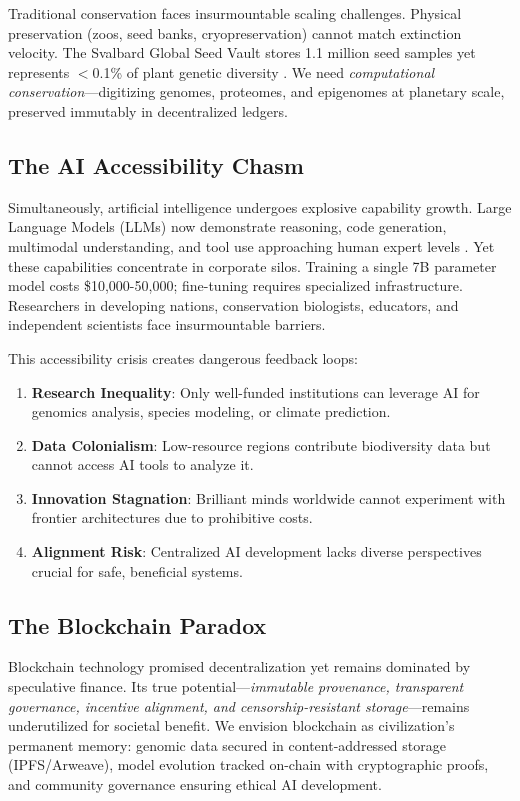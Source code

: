 \documentclass[twocolumn,11pt]{article}
\begin{document}
Traditional conservation faces insurmountable scaling challenges. Physical preservation (zoos, seed banks, cryopreservation) cannot match extinction velocity. The Svalbard Global Seed Vault stores 1.1 million seed samples yet represents $<$0.1\% of plant genetic diversity \citep{svalbard2023report}. We need \textit{computational conservation}—digitizing genomes, proteomes, and epigenomes at planetary scale, preserved immutably in decentralized ledgers.

\subsection{The AI Accessibility Chasm}

Simultaneously, artificial intelligence undergoes explosive capability growth. Large Language Models (LLMs) now demonstrate reasoning, code generation, multimodal understanding, and tool use approaching human expert levels \citep{openai2024gpt4,anthropic2024claude,alibaba2024qwen}. Yet these capabilities concentrate in corporate silos. Training a single 7B parameter model costs \$10,000-50,000; fine-tuning requires specialized infrastructure. Researchers in developing nations, conservation biologists, educators, and independent scientists face insurmountable barriers.

This accessibility crisis creates dangerous feedback loops:
\begin{enumerate}
    \item \textbf{Research Inequality}: Only well-funded institutions can leverage AI for genomics analysis, species modeling, or climate prediction.
    \item \textbf{Data Colonialism}: Low-resource regions contribute biodiversity data but cannot access AI tools to analyze it.
    \item \textbf{Innovation Stagnation}: Brilliant minds worldwide cannot experiment with frontier architectures due to prohibitive costs.
    \item \textbf{Alignment Risk}: Centralized AI development lacks diverse perspectives crucial for safe, beneficial systems.
\end{enumerate}

\subsection{The Blockchain Paradox}

Blockchain technology promised decentralization yet remains dominated by speculative finance. Its true potential—\textit{immutable provenance, transparent governance, incentive alignment, and censorship-resistant storage}—remains underutilized for societal benefit. We envision blockchain as civilization's permanent memory: genomic data secured in content-addressed storage (IPFS/Arweave), model evolution tracked on-chain with cryptographic proofs, and community governance ensuring ethical AI development.
\end{document}
